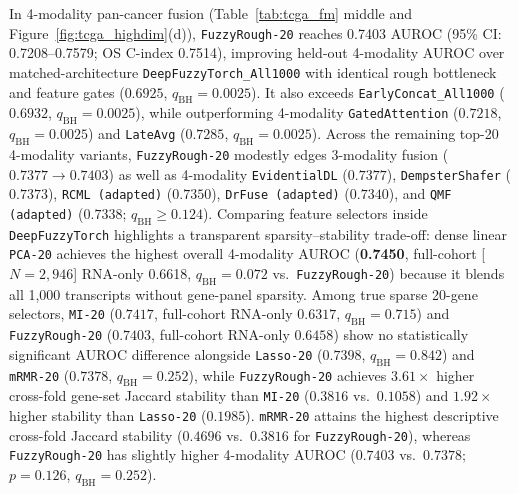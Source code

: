 \documentclass[10pt,twocolumn]{article}
\begin{document}
In 4-modality pan-cancer fusion (Table~\ref{tab:tcga_fm} middle and
Figure~\ref{fig:tcga_highdim}(d)), \texttt{FuzzyRough-20} reaches 0.7403 AUROC (95\%
CI: 0.7208--0.7579; OS C-index 0.7514), improving held-out 4-modality AUROC over
matched-architecture \texttt{DeepFuzzyTorch\_All1000} with identical rough bottleneck and
feature gates ($0.6925$, $q_{\text{BH}}=0.0025$). It also exceeds
\texttt{EarlyConcat\_All1000} ($0.6932$,
$q_{\text{BH}}=0.0025$), while outperforming 4-modality \texttt{GatedAttention} ($0.7218$,
$q_{\text{BH}}=0.0025$) and \texttt{LateAvg} ($0.7285$, $q_{\text{BH}}=0.0025$). Across the
remaining top-20 4-modality variants, \texttt{FuzzyRough-20} modestly edges 3-modality fusion
($0.7377 \to 0.7403$) as well as 4-modality \texttt{EvidentialDL} ($0.7377$),
\texttt{DempsterShafer} ($0.7373$), \texttt{RCML (adapted)} ($0.7350$),
\texttt{DrFuse (adapted)} ($0.7340$), and \texttt{QMF (adapted)} ($0.7338$; $q_{\text{BH}} \ge
0.124$).
Comparing feature selectors inside \texttt{DeepFuzzyTorch} highlights a transparent
sparsity--stability trade-off: dense linear \texttt{PCA-20} achieves the highest overall
4-modality AUROC (\textbf{0.7450}, full-cohort [$N=2,946$] RNA-only 0.6618,
$q_{\text{BH}}=0.072$ vs.\ \texttt{FuzzyRough-20}) because it blends all 1,000 transcripts
without gene-panel sparsity. Among true sparse 20-gene selectors, \texttt{MI-20} ($0.7417$,
full-cohort RNA-only $0.6317$, $q_{\text{BH}}=0.715$) and \texttt{FuzzyRough-20} ($0.7403$,
full-cohort RNA-only $0.6458$) show no statistically significant AUROC difference alongside
\texttt{Lasso-20} ($0.7398$, $q_{\text{BH}}=0.842$) and \texttt{mRMR-20} ($0.7378$,
$q_{\text{BH}}=0.252$), while \texttt{FuzzyRough-20} achieves $3.61\times$ higher cross-fold
gene-set Jaccard stability than \texttt{MI-20} ($0.3816$ vs.\ $0.1058$) and $1.92\times$ higher
stability than \texttt{Lasso-20} ($0.1985$). \texttt{mRMR-20} attains the highest descriptive
cross-fold Jaccard stability ($0.4696$ vs.\ $0.3816$ for \texttt{FuzzyRough-20}), whereas
\texttt{FuzzyRough-20} has slightly higher 4-modality AUROC ($0.7403$ vs.\ $0.7378$;
$p=0.126$, $q_{\text{BH}}=0.252$).
\end{document}

